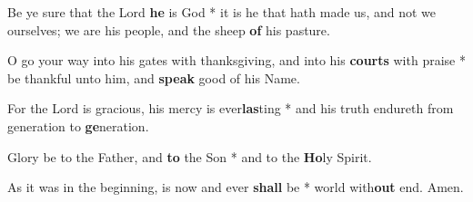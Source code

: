 \begin{multicols}{2}
	Be ye sure that the Lord \textbf{he} is God * it is he that hath made us, and not we ourselves; we are his people, and the sheep \textbf{of} his pasture.
	
	O go your way into his gates with thanksgiving, and into his \textbf{courts} with praise * be thankful unto him, and \textbf{speak} good of his Name.
	
	For the Lord is gracious, his mercy is ever\textbf{las}ting * and his truth endureth from generation to \textbf{ge}neration.
	
	Glory be to the Father, and \textbf{to} the Son * and to the \textbf{Ho}ly Spirit.
	
	As it was in the beginning, is now and ever \textbf{shall} be * world with\textbf{out} end. Amen.
\end{multicols}